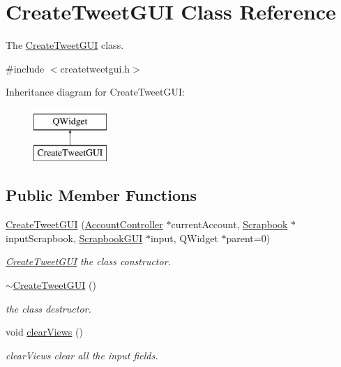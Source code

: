 \hypertarget{classCreateTweetGUI}{}\section{Create\+Tweet\+G\+UI Class Reference}
\label{classCreateTweetGUI}


The \hyperlink{classCreateTweetGUI}{Create\+Tweet\+G\+UI} class.  




{\ttfamily \#include $<$createtweetgui.\+h$>$}

Inheritance diagram for Create\+Tweet\+G\+UI\+:\begin{figure}[H]
\begin{center}
\leavevmode
\includegraphics[height=2.000000cm]{classCreateTweetGUI}
\end{center}
\end{figure}
\subsection*{Public Member Functions}
\begin{DoxyCompactItemize}
\item 
\hyperlink{classCreateTweetGUI_abe025a0ab79c06a0cead0452a041f81d}{Create\+Tweet\+G\+UI} (\hyperlink{classAccountController}{Account\+Controller} $\ast$current\+Account, \hyperlink{classScrapbook}{Scrapbook} $\ast$input\+Scrapbook, \hyperlink{classScrapbookGUI}{Scrapbook\+G\+UI} $\ast$input, Q\+Widget $\ast$parent=0)
\begin{DoxyCompactList}\small\item\em \hyperlink{classCreateTweetGUI}{Create\+Tweet\+G\+UI} the class constructor. \end{DoxyCompactList}\item 
\hyperlink{classCreateTweetGUI_a5dc6c167bb390068eb50a8775a81d0f6}{$\sim$\+Create\+Tweet\+G\+UI} ()
\begin{DoxyCompactList}\small\item\em the class destructor. \end{DoxyCompactList}\item 
void \hyperlink{classCreateTweetGUI_a2d347f9721579a4cc5355e77834944fb}{clear\+Views} ()\hypertarget{classCreateTweetGUI_a2d347f9721579a4cc5355e77834944fb}{}\label{classCreateTweetGUI_a2d347f9721579a4cc5355e77834944fb}

\begin{DoxyCompactList}\small\item\em clear\+Views clear all the input fields. \end{DoxyCompactList}\end{DoxyCompactItemize}


